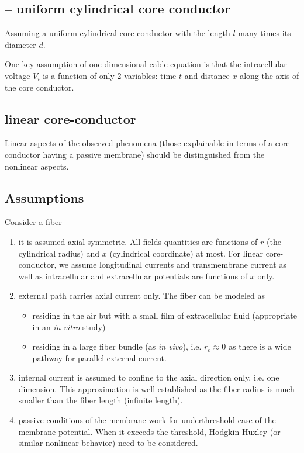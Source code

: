 \subsection{-- uniform cylindrical core conductor}

Assuming a uniform cylindrical core conductor with the length $l$ many times its
diameter $d$.


One key assumption of one-dimensional cable equation is that the intracellular
voltage $V_i$ is a function of only 2 variables: time $t$ and distance $x$ along
the axis of the core conductor.


\subsection{linear core-conductor}

Linear aspects of the observed phenomena (those explainable in terms of a core
conductor having a passive membrane) should be distinguished from the nonlinear
aspects.


\subsection{Assumptions}
\label{sec:assumptions-1}

Consider a fiber 
\begin{enumerate}
\item it is assumed axial symmetric. All fields quantities are
  functions of $r$ (the cylindrical radius) and $x$ (cylindrical
  coordinate) at most. For linear core-conductor, we assume
  longitudinal currents and transmembrane current as well as
  intracellular and extracellular potentials are functions of $x$
  only.

\item external path carries axial current only. The fiber can be
  modeled as
  \begin{itemize}
  \item residing in the air but with a small film of extracellular
    fluid (appropriate in an {\it in vitro} study)
  \item residing in a large fiber bundle (as  {\it in vivo}),
    i.e. $r_e\approx 0$ as there is a wide pathway for parallel
    external current.
  \end{itemize}
\item internal current is assumed to confine to the axial direction
  only, i.e. one dimension. This approximation is well established as
  the fiber radius is much smaller than the fiber length (infinite
  length). 
\item passive conditions of the membrane work for underthreshold case
  of the membrane potential. When it exceeds the threshold,
  Hodgkin-Huxley (or similar nonlinear behavior) need to be
  considered.
\end{enumerate}

